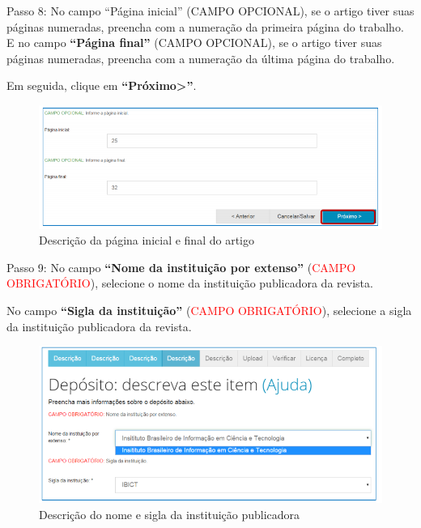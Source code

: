 \documentclass[12pt,hidelinks]{article}
\begin{document}
    Passo 8: No campo “Página inicial” (\textcolor{applegreen}{CAMPO OPCIONAL}), se o artigo tiver suas páginas numeradas, preencha com a numeração da primeira página do trabalho. E no campo \textbf{“Página final”} (\textcolor{applegreen}{CAMPO OPCIONAL}), se o artigo tiver suas páginas numeradas, preencha com a numeração da última página do trabalho.
    
    Em seguida, clique em \textbf{“Próximo>”}.
    
    \begin{figure}[!htp]
                \centering
                \includegraphics[scale=0.8]{figura/Figura147.png}
                \caption{Descrição da página inicial e final do artigo}
            \label{Rotulo}
        \end{figure}
    
    Passo 9: No campo \textbf{“Nome da instituição por extenso”} (\textcolor{red}{CAMPO OBRIGATÓRIO}), selecione o nome da instituição publicadora da revista.
    
\newpage
    
    No campo \textbf{“Sigla da instituição”} (\textcolor{red}{CAMPO OBRIGATÓRIO}), selecione a sigla da instituição publicadora da revista.
    
    \begin{figure}[!htp]
                \centering
                \includegraphics[scale=0.8]{figura/Figura148.png}
                \caption{Descrição do nome e sigla da instituição publicadora}
            \label{Rotulo}
        \end{figure}
    
\end{document}
